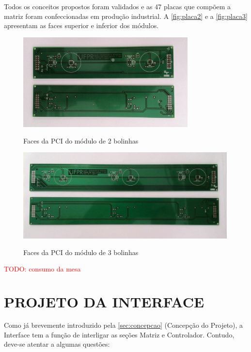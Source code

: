 Todos os conceitos propostos foram validados e as 47 placas que compõem a matriz foram confeccionadas em produção industrial. A \autoref{fig:placa2} e a \autoref{fig:placa3} apresentam as faces superior e inferior dos módulos.

\begin{figure}[H]
    \centering
    \caption{Faces da PCI do módulo de 2 bolinhas}
    \includegraphics[width=0.8\textwidth]{./dados/figuras/bloco-2}
    \label{fig:placa2}
\end{figure}

\begin{figure}[H]
    \centering
    \caption{Faces da PCI do módulo de 3 bolinhas}
    \includegraphics[width=0.99\textwidth]{./dados/figuras/bloco-3}
    \label{fig:placa3}
\end{figure}

\textcolor{red}{TODO: consumo da mesa}

\section{PROJETO DA INTERFACE}
\label{sec:interface}

Como já brevemente introduzido pela \autoref{sec:concepcao} (Concepção do Projeto), a Interface tem a função de interligar as seções Matriz e Controlador. Contudo, deve-se atentar a algumas questões:

